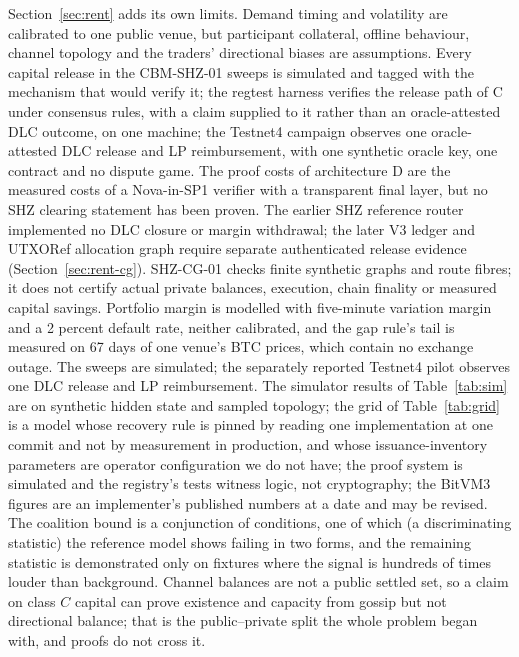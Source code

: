 \documentclass[11pt]{article}
\theoremstyle{plain}
\theoremstyle{definition}
\theoremstyle{remark}
\begin{document}
Section~\ref{sec:rent} adds its own limits. Demand timing and volatility are calibrated to one public venue, but participant collateral, offline behaviour, channel topology and the traders' directional biases are assumptions. Every capital release in the CBM-SHZ-01 sweeps is simulated and tagged with the mechanism that would verify it; the regtest harness verifies the release path of C under consensus rules, with a claim supplied to it rather than an oracle-attested DLC outcome, on one machine; the Testnet4 campaign observes one oracle-attested DLC release and LP reimbursement, with one synthetic oracle key, one contract and no dispute game. The proof costs of architecture D are the measured costs of a Nova-in-SP1 verifier with a transparent final layer, but no SHZ clearing statement has been proven. The earlier SHZ reference router implemented no DLC closure or margin withdrawal; the later V3 ledger and UTXORef allocation graph require separate authenticated release evidence (Section~\ref{sec:rent-cg}). SHZ-CG-01 checks finite synthetic graphs and route fibres; it does not certify actual private balances, execution, chain finality or measured capital savings. Portfolio margin is modelled with five-minute variation margin and a 2 percent default rate, neither calibrated, and the gap rule's tail is measured on 67 days of one venue's BTC prices, which contain no exchange outage. The sweeps are simulated; the separately reported Testnet4 pilot observes one DLC release and LP reimbursement. The simulator results of Table~\ref{tab:sim} are on synthetic hidden state and sampled topology; the grid of Table~\ref{tab:grid} is a model whose recovery rule is pinned by reading one implementation at one commit and not by measurement in production, and whose issuance-inventory parameters are operator configuration we do not have; the proof system is simulated and the registry's tests witness logic, not cryptography; the BitVM3 figures are an implementer's published numbers at a date and may be revised. The coalition bound is a conjunction of conditions, one of which (a discriminating statistic) the reference model shows failing in two forms, and the remaining statistic is demonstrated only on fixtures where the signal is hundreds of times louder than background. Channel balances are not a public settled set, so a claim on class $C$ capital can prove existence and capacity from gossip but not directional balance; that is the public--private split the whole problem began with, and proofs do not cross it.
\end{document}
